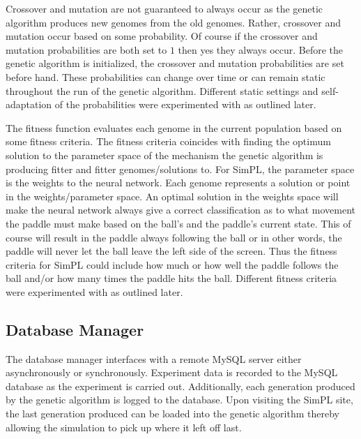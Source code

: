 \documentclass[a4paper,10pt]{article}
\begin{document}
Crossover and mutation are not guaranteed to always occur as the genetic algorithm produces new genomes from the old genomes. Rather, crossover and mutation occur based on some probability. Of course if the crossover and mutation probabilities are both set to $1$ then yes they always occur. Before the genetic algorithm is initialized, the crossover and mutation probabilities are set before hand. These probabilities can change over time or can remain static throughout the run of the genetic algorithm. Different static settings and self-adaptation of the probabilities were experimented with as outlined later. 

The fitness function evaluates each genome in the current population based on some fitness criteria. The fitness criteria coincides with finding the optimum solution to the parameter space of the mechanism the genetic algorithm is producing fitter and fitter genomes/solutions to. For SimPL, the parameter space is the weights to the neural network. Each genome represents a solution or point in the weights/parameter space. An optimal solution in the weights space will make the neural network always give a correct classification as to what movement the paddle must make based on the ball's and the paddle's current state. This of course will result in the paddle always following the ball or in other words, the paddle will never let the ball leave the left side of the screen. Thus the fitness criteria for SimPL could include how much or how well the paddle follows the ball and/or how many times the paddle hits the ball. Different fitness criteria were experimented with as outlined later. 


\subsection{Database Manager}

The database manager interfaces with a remote MySQL server either asynchronously or synchronously. Experiment data is recorded to the MySQL database as the experiment is carried out. Additionally, each generation produced by the genetic algorithm is logged to the database. Upon visiting the SimPL site, the last generation produced can be loaded into the genetic algorithm thereby allowing the simulation to pick up where it left off last.  
\end{document}
